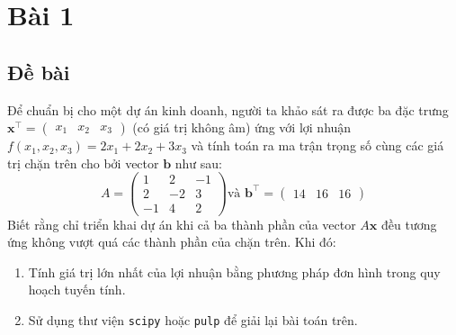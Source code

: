 \documentclass[12pt]{article}
\begin{document}
	
\tableofcontents
\pagebreak

\section{Bài 1}
\subsection{Đề bài}
Để chuẩn bị cho một dự án kinh doanh, người ta khảo sát ra được ba đặc trưng $\mathbf{x}^{\intercal} = \begin{pmatrix}x_1 & x_2 & x_3\end{pmatrix}$ (có giá trị không âm) ứng với lợi nhuận $f(x_1, x_2, x_3) = 2x_1 + 2x_2 + 3x_3$ và tính toán ra ma trận trọng số cùng các giá trị chặn trên cho bởi vector $\mathbf{b}$ như sau:
$$
A = \begin{pmatrix}
1 & 2 & -1 \\
2 & -2 & 3 \\
-1 & 4 & 2
\end{pmatrix}
\text{và\ }
\mathbf{b}^{\intercal} = \begin{pmatrix}
14 & 16 & 16
\end{pmatrix}
$$
Biết rằng chỉ triển khai dự án khi cả ba thành phần của vector $A\mathbf{x}$ đều tương ứng không vượt quá các thành phần của chặn trên. Khi đó:
\begin{enumerate}[label=(\alph*)]
\item Tính giá trị lớn nhất của lợi nhuận bằng phương pháp đơn hình trong quy hoạch tuyến tính.
\item Sử dụng thư viện \texttt{scipy} hoặc \texttt{pulp} để giải lại bài toán trên.
\end{enumerate}
\end{document}
